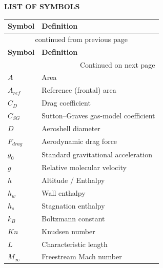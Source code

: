 \clearpage
{}
{}
\begin{center}
{\bfseries \Large LIST OF SYMBOLS}
\end{center}
\vspace{1em}

\begingroup
\setlength{\LTleft}{0.5cm}
\setlength{\LTright}{0.5cm}
\renewcommand{\arraystretch}{1.05}
\begin{longtable}{|p{3.4cm}|p{8.2cm}|}
\hline
    \textbf{Symbol} & \textbf{Definition}            \\
\hline
\endfirsthead
\multicolumn{2}{|c|}{continued from previous page} \\
\hline
    \textbf{Symbol} & \textbf{Definition}            \\
\hline
\endhead
\hline \multicolumn{2}{|r|}{{Continued on next page}} \\ \hline
\endfoot
\hline
\endlastfoot
    $A$         & Area                                  \\
    $A_{ref}$ & Reference (frontal) area         \\
    $C_D$       & Drag coefficient                      \\
    $C_{SG}$    & Sutton--Graves gas-model coefficient  \\
    $D$         & Aeroshell diameter                    \\
    $F_{drag}$ & Aerodynamic drag force          \\
    $g_0$       & Standard gravitational acceleration   \\
    $g$         & Relative molecular velocity           \\
    $h$         & Altitude / Enthalpy                   \\
    $h_w$       & Wall enthalpy                         \\
    $h_s$       & Stagnation enthalpy                   \\
    $k_B$       & Boltzmann constant                    \\
    $Kn$        & Knudsen number                        \\
    $L$         & Characteristic length                 \\
    $M_\infty$  & Freestream Mach number                \\

\end{longtable}

